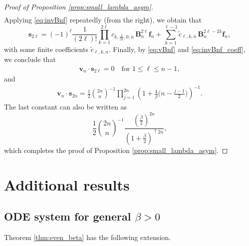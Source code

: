 \documentclass[12pt]{article}
\theoremstyle{definition} %
\theoremstyle{remark} %
\begin{document}
\begin{proof}[Proof of Proposition \ref{prop:small_lambda_asym}]
\begin{align*}
   \end{align*}
Applying  \eqref{eq:invBnf} repeatedly (from the right), we obtain that 
\[
  \mathbf{s}_{2\ell} =(-1)^\ell \frac{1}{(2\ell)!}\prod_{k=1}^{2\ell} c_{k,\frac{4}{\beta k },0,n} \,\mathbf{B}_n^{2\ell} \mathbf{f}_n + \sum_{k=1}^{\ell-1} \tilde{c}_{\ell, k, n} \, \mathbf{B}_n^{2\ell-2k} \mathbf{f}_n,
\]
with some finite coefficients  $\tilde{c}_{\ell, k, n}$.
Finally, by \eqref{eq:vBnf} and \eqref{eq:invBnf_coeff}, we conclude that
\begin{align*}
     \mathbf{v}_n\cdot \mathbf{s}_{2\ell} = 0 \quad \text{for } 1\le \ell\le n-1,
\end{align*}
and
\begin{align*}
    \mathbf{v}_n\cdot \mathbf{s}_{2n}
    = \frac{1}{2}\binom{2n}{n}^{-1} \prod_{j=1}^{2n}\left(1+\tfrac{4}{\beta}\Big(n-\tfrac{j-1}{2}\Big)\right)^{-1}.
\end{align*}
The last constant can also be written as 
\[
\frac12 \binom{2n}{n}^{-1}\frac{(\tfrac{\beta}{2})^{2n}}{\left(1+\frac{\beta}{2}\right)^{\uparrow 2n}},
\]
which completes the proof of Proposition \ref{prop:small_lambda_asym}.
\end{proof}

\section{Additional results}\label{sec:additional}


\subsection{ODE system for general $\beta>0$}

Theorem \ref{thm:even_beta} has the following extension. 
\end{document}
